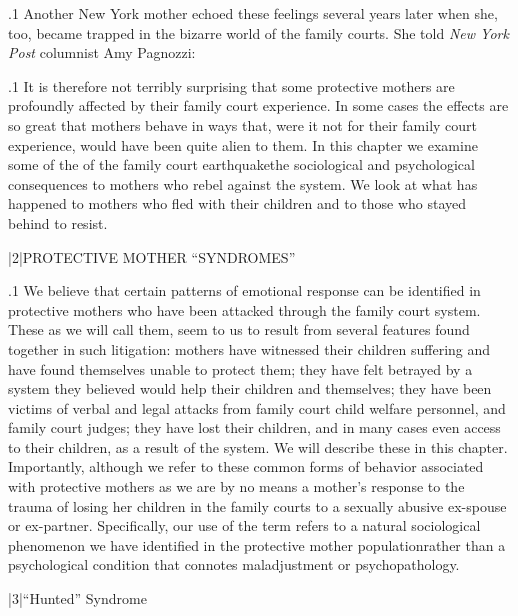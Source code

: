 \documentclass[11pt, twoside]{article}
\begin{document}
{\p.1{%
Another New York mother echoed these feelings several years later
when she, too, became trapped in the bizarre world of the family courts.
She told \textit{New York Post} columnist Amy Pagnozzi: 
}%

\p.1{%
It is therefore not terribly surprising that some protective mothers are
profoundly affected by their family court experience. In some cases the
effects are so great that mothers behave in ways that, were it not for their
family court experience, would have been quite alien to them.
In this chapter we examine some of the  of the family
court earthquake\mdash{}the sociological and psychological consequences to
mothers who rebel against the system. We look at what has happened to
mothers who fled with their children and to those who stayed behind to
resist.
}%


\s|2|{PROTECTIVE MOTHER ``SYNDROMES''}

\p.1{%
\noindent{}We believe that certain patterns of emotional response can be identified
in protective mothers who have been attacked through the family court
system. These  as we will call them, seem to us to result
from several features found together in such litigation: mothers have
witnessed their children suffering and have found themselves unable to
protect them; they have felt betrayed by a system they believed would
help their children and themselves; they have been victims of verbal and
legal attacks from family court  child welfare personnel, and
family court judges; they have lost their children, and in many cases even
access to their children, as a result of the system. We will describe these
 in this chapter. Importantly, although we refer to these
common forms of behavior associated with protective mothers as  we are by no means  a mother’s response to the
trauma of losing her children in the family courts to a sexually abusive
ex-spouse or ex-partner. Specifically, our use of the term 
refers to a natural sociological phenomenon we have identified in the
protective mother population\mdash{}rather than a psychological condition
that connotes maladjustment or psychopathology.
}%


\s|3|{``Hunted'' Syndrome}

}
\end{document}
